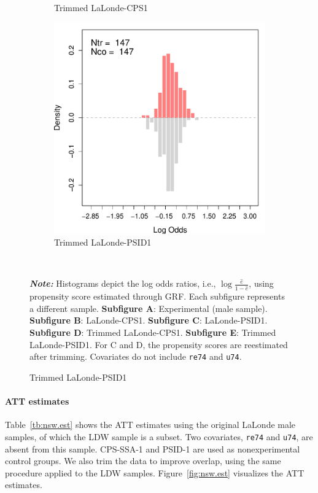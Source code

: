 \documentclass[letterpaper,12pt,leqno]{article}
\begin{document}
\begin{figure}[!ht]
\begin{minipage}[c]{.65\textwidth}
\begin{subfigure}{0.45\linewidth}
            \caption{Trimmed LaLonde-CPS1}
        \end{subfigure}
        \begin{subfigure}{0.45\linewidth}
            \includegraphics[width=\linewidth]{odds_nsw_psid_trim.pdf}
            \caption{Trimmed LaLonde-PSID1}
        \end{subfigure}
    \end{minipage}%
    \\\raggedright
     {\footnotesize\textbf{\textit{Note:}} Histograms depict the log odds ratios, i.e., $\log\frac{\hat{e}}{1-\hat{e}}$, using propensity score estimated through GRF. Each subfigure represents a different sample. \textbf{Subfigure A}: Experimental (male sample). \textbf{Subfigure B}: LaLonde-CPS1. \textbf{Subfigure C}: LaLonde-PSID1. \textbf{Subfigure D}: Trimmed LaLonde-CPS1. \textbf{Subfigure E}: Trimmed LaLonde-PSID1. For C and D, the propensity scores are reestimated after trimming. Covariates do not include \texttt{re74} and \texttt{u74}.}
\end{figure}
\clearpage

\paragraph{ATT estimates} Table~\ref{tb:nsw.est} shows the ATT estimates using the original LaLonde male samples, of which the LDW sample is a subset. Two covariates, \texttt{re74} and \texttt{u74}, are absent from this sample. CPS-SSA-1 and PSID-1 are used as nonexperimental control groups. We also trim the data to improve overlap, using the same procedure applied to the LDW samples. Figure~\ref{fig:nsw.est} visualizes the ATT estimates.
\end{document}
